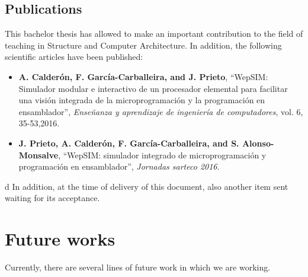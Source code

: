 \subsection*{Publications}

This bachelor thesis has allowed to make an important contribution to the field of teaching in Structure and Computer Architecture. In addition, the following scientific articles have been published:

\begin{itemize}

\item \textbf{A. Calderón, F. García-Carballeira, and J. Prieto}, “WepSIM: Simulador modular e interactivo de un procesador elemental para facilitar una visión integrada de la microprogramación y la programación en ensamblador”, \textit{Enseñanza y aprendizaje de ingeniería de computadores}, vol. 6, 35-53,2016. \cite{mateos2016wepsim}

\item \textbf{J. Prieto, A. Calderón, F. García-Carballeira, and S. Alonso-Monsalve}, “WepSIM: simulador integrado de microprogramación y programación en ensamblador”, \textit{Jornadas sarteco 2016}. \cite{arcos2032}

\end{itemize}
d
In addition, at the time of delivery of this document, also another item sent waiting for its acceptance.

\vspace{1cm}

\section*{Future works}

Currently, there are several lines of future work in which we are working.

